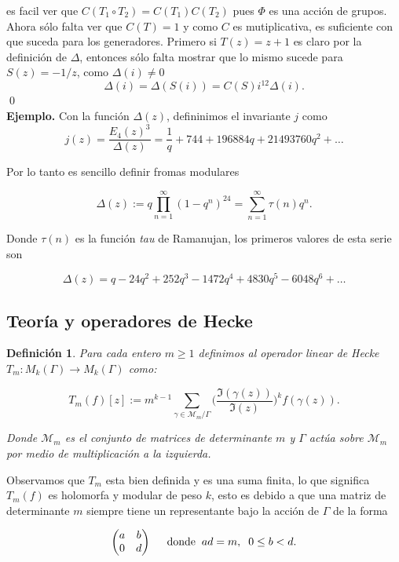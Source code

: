 \documentclass[letterpaper]{article}
\newtheorem{def.}{Definici\'on}[section]
\newcommand{\eje}{{\noindent \sc \textbf{Ejemplo. }}}
\newcommand{\ga}{\ensuremath{\Gamma}}
\newcommand{\modk}{\ensuremath{M_k(\Gamma)}}
\begin{document}
\noindent es facil ver que \(C(T_1\circ T_2)=C(T_1)C(T_2)\) pues \(\Phi\) es una acción de grupos. Ahora sólo falta ver que \(C(T)=1\) y como \(C\) es mutiplicativa, es suficiente con que suceda para los generadores. Primero si \(T(z)=z+1\) es claro por la definición de \(\Delta\), entonces sólo falta mostrar que lo mismo sucede para \(S(z)=-1/z\), como \(\Delta(i)\neq0\)
\[
\Delta(i)=\Delta(S(i))=C(S)i^{12}\Delta(i).
\]
\qed\\
\eje Con la función \(\Delta(z)\), defininimos el invariante \(j\) como
\[
j(z)=\frac{E_4(z)^3}{\Delta(z)}=\frac{1}{q}+744+196884q+21493760q^2+\dots
\]

Por lo tanto es sencillo definir fromas modulares

\begin{equation}
\Delta(z):=q \prod_{n=1}^{\infty}(1-q^n)^{24}=\sum_{n=1}^{\infty}\tau(n)q^n.
\end{equation}

Donde $\tau(n)$ es la función \textit{tau} de Ramanujan, los primeros valores de esta serie son

$$
\Delta(z)=q-24q^2+252q^3-1472q^4+4830q^5-6048 q^6+\ldots
$$
\subsection{Teoría y operadores de Hecke}

\begin{def.}
Para cada entero $m\geq 1$ definimos al operador linear de Hecke $T_m:\modk\rightarrow\modk$ como:

\begin{equation}
T_m(f)[z]:=m^{k-1}\sum_{\gamma\in\mathcal{M}_m/\ga}\Big(\frac{\Im(\gamma(z))}{\Im(z)}\Big)^k f(\gamma(z)).
\end{equation}

Donde $\mathcal{M}_m$ es el conjunto de matrices de determinante $m$ y $\ga$ actúa sobre $\mathcal{M}_m$ por medio de multiplicación a la izquierda.
\end{def.}

\noindent Observamos que $T_m$ esta bien definida y es una suma finita, lo que significa $T_m(f)$ es holomorfa y modular de peso $k$, esto es debido a que una matriz de determinante $m$ siempre tiene un representante bajo la acción de $\ga$ de la forma

$$
\begin{pmatrix}
a & b \\
0 & d
\end{pmatrix}
\hspace{0.5cm}\textrm{donde}\hspace{0.2cm}ad=m,\hspace{0.2cm}0\leq b < d.
$$
\end{document}

